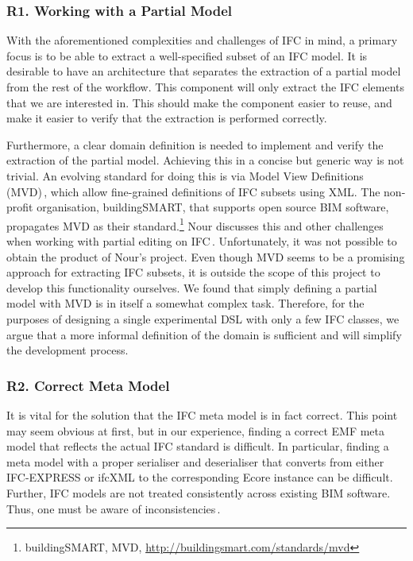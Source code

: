 \subsubsection{R1. Working with a Partial Model}
With the aforementioned complexities and challenges of IFC in mind, a primary focus is to be able to extract a well-specified subset of an IFC model. It is desirable to have an architecture that separates the extraction of a partial model from the rest of the workflow. This component will only extract the IFC elements that we are interested in. This should make the component easier to reuse, and make it easier to verify that the extraction is performed correctly.

Furthermore, a clear domain definition is needed to implement and verify the extraction of the partial model. Achieving this in a concise but generic way is not trivial. An evolving standard for doing this is via Model View Definitions (MVD)\,\cite{nour08}, which allow fine-grained definitions of IFC subsets using XML. The non-profit organisation, buildingSMART, that supports open source BIM software, propagates MVD as their standard.\footnote{buildingSMART, MVD, \url{http://buildingsmart.com/standards/mvd}} Nour discusses this and other challenges when working with partial editing on IFC\,\cite{nour08}. Unfortunately, it was not possible to obtain the product of Nour's project. Even though MVD seems to be a promising approach for extracting IFC subsets, it is outside the scope of this project to develop this functionality ourselves. We found that simply defining a partial model with MVD is in itself a somewhat complex task. Therefore, for the purposes of designing a single experimental DSL with only a few IFC classes, we argue that a more informal definition of the domain is sufficient and will simplify the development process.

\subsubsection{R2. Correct Meta Model}
It is vital for the solution that the IFC meta model is in fact correct. This point may seem obvious at first, but in our experience, finding a correct EMF meta model that reflects the actual IFC standard is difficult. In particular, finding a meta model with a proper serialiser and deserialiser that converts from either IFC-EXPRESS or ifcXML to the corresponding Ecore instance can be difficult. Further, IFC models are not treated consistently across existing BIM software. Thus, one must be aware of inconsistencies\,\cite[p. 4]{quteprints37725}.


